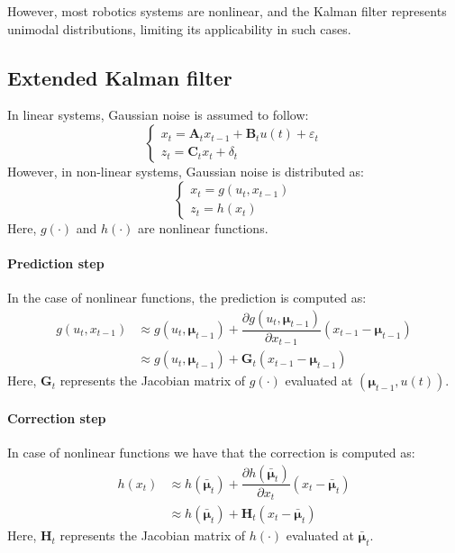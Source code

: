 However, most robotics systems are nonlinear, and the Kalman filter represents unimodal distributions, limiting its applicability in such cases.

\subsection{Extended Kalman filter}
In linear systems, Gaussian noise is assumed to follow:
\[\begin{cases}
    x_t=\mathbf{A}_tx_{t-1}+\mathbf{B}_tu(t)+\varepsilon_t \\
    z_t=\mathbf{C}_tx_t+\delta_t
\end{cases}\]
However, in non-linear systems, Gaussian noise is distributed as:
\[\begin{cases}
    x_t=g(u_t,x_{t-1}) \\
    z_t=h(x_t)
\end{cases}\]
Here, $g(\cdot)$ and $h(\cdot)$ are nonlinear functions. 

\paragraph*{Prediction step}
In the case of nonlinear functions, the prediction is computed as:
\begin{align*}
    g(u_t,x_{t-1})  &\approx g(u_t,\boldsymbol{\mu}_{t-1})+\dfrac{\partial g(u_t,\boldsymbol{\mu}_{t-1})}{\partial x_{t-1}} (x_{t-1}-\boldsymbol{\mu}_{t-1}) \\
                    &\approx g(u_t,\boldsymbol{\mu}_{t-1})+\mathbf{G}_t(x_{t-1}-\boldsymbol{\mu}_{t-1})
\end{align*} 
Here, $\mathbf{G}_t$ represents the Jacobian matrix of $g(\cdot)$ evaluated at $\left(\boldsymbol{\mu}_{t-1},u(t)\right)$. 

\paragraph*{Correction step}
In case of nonlinear functions we have that the correction is computed as: 
\begin{align*}
    h(x_t)  &\approx h(\bar{\boldsymbol{\mu}}_t)+\dfrac{\partial h(\bar{\boldsymbol{\mu}}_t)}{\partial x_t}(x_t-\bar{\boldsymbol{\mu}}_t) \\
            &\approx h(\bar{\boldsymbol{\mu}}_t)+\mathbf{H}_t(x_t-\bar{\boldsymbol{\mu}}_t)
\end{align*} 
Here, $\mathbf{H}_t$ represents the Jacobian matrix of $h(\cdot)$ evaluated at $\bar{\boldsymbol{\mu}}_t$. 

